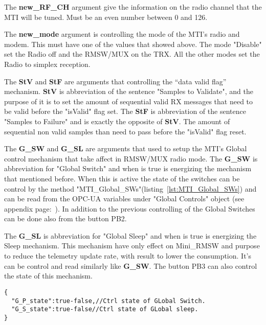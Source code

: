 The \textbf{new\_RF\_CH} argument give the information on the radio channel that the MTI will be tuned. Must be an even number between 0 and 126.

The \textbf{new\_mode} argument is controlling the mode of the MTI's radio and modem. This must have one of the values that showed above. The mode "Disable"
set the Radio off and the RMSW/MUX on the TRX. All the other modes set the Radio to simplex reception.

The \textbf{StV} and \textbf{StF} are arguments that controlling the ``data valid flag'' mechanism. \textbf{StV} is abbreviation of the sentence "Samples to Validate",
and the purpose of it is to set the amount of sequential valid RX messages that need to be valid before the "isValid" flag set.
The \textbf{StF} is abbreviation of the sentence "Samples to Failure" and is exactly the opposite of \textbf{StV}.
The amount of sequential non valid samples than need to pass before the "isValid" flag reset.

The \textbf{G\_SW} and \textbf{G\_SL} are arguments that used to setup the MTI's Global control mechanism that take affect in RMSW/MUX radio mode.
The \textbf{G\_SW} is abbreviation for "Global Switch" and when is true is energizing the mechanism that mentioned before.
When this is active the state of the switches can be control by the method "MTI\_Global\_SWs"(listing~\ref{lst:MTI_Global_SWs}) and can be read from the OPC-UA variables under "Global Controls" object (see appendix page:~\pageref{tree:RMSW/MUX}).
In addition to the previous controlling of the Global Switches can be done also from the button PB2.

The \textbf{G\_SL} is abbreviation for "Global Sleep" and when is true is energizing the Sleep mechanism. This mechanism have only effect on Mini\_RMSW and purpose to reduce the
telemetry update rate, with result to lower the consumption. It's can be control and read similarly like \textbf{G\_SW}. The button PB3 can also control the state of this mechanism.

\begin{lstlisting}[frame=single,caption=Argument for MTI\_Global\_SWs(), label=lst:MTI_Global_SWs]
{
  "G_P_state":true-false,//Ctrl state of GLobal Switch.
  "G_S_state":true-false//Ctrl state of GLobal sleep.
}
\end{lstlisting}

